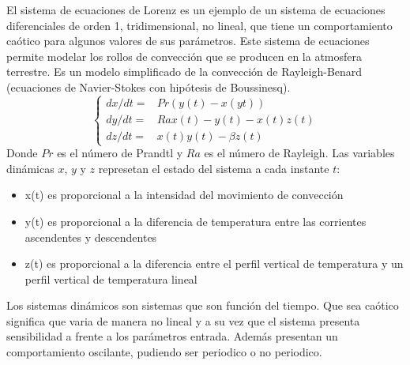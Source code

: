 El sistema de ecuaciones de Lorenz es un ejemplo de un sistema de ecuaciones diferenciales de orden 1, tridimensional, no lineal, que tiene un comportamiento caótico para algunos valores de sus parámetros. Este sistema de ecuaciones permite modelar los rollos de convección que se producen en la atmosfera terrestre. Es un modelo simplificado de la convección de Rayleigh-Benard (ecuaciones de Navier-Stokes con hipótesis de Boussinesq).
\begin{equation}
\left\{ 
\begin{matrix}
dx/dt =& Pr (y(t) - x(yt)) \\
dy/dt =& Ra x(t) - y(t) - x(t)z(t) \\
dz/dt =& x(t) y(t) - \beta z(t)
\end{matrix} \right.
\end{equation}
Donde $Pr$ es el número de Prandtl y $Ra$ es el número de Rayleigh. Las variables dinámicas $x$, $y$ y $z$ represetan el estado del sistema a cada instante $t$:

\begin{itemize}
\item x(t) es proporcional a la intensidad del movimiento de convección  
\item y(t) es proporcional a la diferencia de temperatura entre las corrientes ascendentes y descendentes
\item z(t) es proporcional a la diferencia entre el perfil vertical de temperatura y un perfil vertical de temperatura lineal
\end{itemize}

Los sistemas dinámicos son sistemas que son función del tiempo. Que sea caótico significa que varia de manera no lineal y a su vez que el sistema presenta sensibilidad a frente a los parámetros entrada. Además presentan un comportamiento oscilante, pudiendo ser periodico o no periodico. \\

